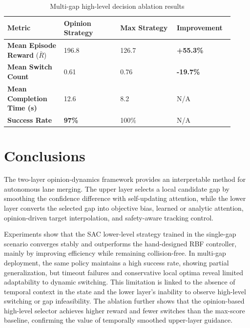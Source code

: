 \begin{table}[!htbp]
\centering
\caption{Multi-gap high-level decision ablation results}
\label{tab:multi-gap-ablation}
\footnotesize
\begin{tabular}{p{0.23\linewidth}p{0.23\linewidth}p{0.23\linewidth}p{0.23\linewidth}}
\toprule
Metric & Opinion Strategy & Max Strategy & Improvement \\
\midrule
\textbf{Mean Episode Reward} (\(\bar{R}\)) & 196.8 & 126.7 & \textbf{+55.3\%} \\
\textbf{Mean Switch Count} & 0.61 & 0.76 & \textbf{-19.7\%} \\
\textbf{Mean Completion Time (s)} & 12.6 & 8.2 & N/A\\
\textbf{Success Rate} & \textbf{97\%} & 100\% & N/A\\
\bottomrule
\end{tabular}
\end{table}



\section{Conclusions}





The two-layer opinion-dynamics framework provides an interpretable method for autonomous lane merging. The upper layer selects a local candidate gap by smoothing the confidence difference with self-updating attention, while the lower layer converts the selected gap into objective bias, learned or analytic attention, opinion-driven target interpolation, and safety-aware tracking control.



Experiments show that the SAC lower-level strategy trained in the single-gap scenario converges stably and outperforms the hand-designed RBF controller, mainly by improving efficiency while remaining collision-free. In multi-gap deployment, the same policy maintains a high success rate, showing partial generalization, but timeout failures and conservative local optima reveal limited adaptability to dynamic switching. This limitation is linked to the absence of temporal context in the state and the lower layer's inability to observe high-level switching or gap infeasibility. The ablation further shows that the opinion-based high-level selector achieves higher reward and fewer switches than the max-score baseline, confirming the value of temporally smoothed upper-layer guidance.

